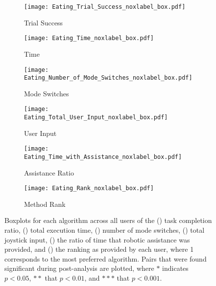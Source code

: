 \begin{figure}[t]
\centering
{}
\begin{subfigure}{0.238\textwidth}
  \texttt{[image: Eating\_Trial\_Success\_noxlabel\_box.pdf]}
  \caption{Trial Success}
  \label{subfig:trial_success}
\end{subfigure}
\hfill
\begin{subfigure}{0.242\textwidth}
  \texttt{[image: Eating\_Time\_noxlabel\_box.pdf]}
  \caption{Time}
  \label{subfig:time}
\end{subfigure}

\begin{subfigure}{0.238\textwidth}
  \texttt{[image: Eating\_Number\_of\_Mode\_Switches\_noxlabel\_box.pdf]}
  \caption{Mode Switches}
  \label{subfig:num_mode_switches}
\end{subfigure}
\hfill
\begin{subfigure}{0.242\textwidth}
  \texttt{[image: Eating\_Total\_User\_Input\_noxlabel\_box.pdf]}
  \caption{User Input}
  \label{subfig:user_input}
\end{subfigure}

\begin{subfigure}{0.238\textwidth}
  \texttt{[image: Eating\_Time\_with\_Assistance\_noxlabel\_box.pdf]}
  \caption{Assistance Ratio}
  \label{subfig:assist_ratio}
\end{subfigure}
\hfill
\begin{subfigure}{0.242\textwidth}
  \texttt{[image: Eating\_Rank\_noxlabel\_box.pdf]}
  \caption{Method Rank}
  \label{subfig:rank}
\end{subfigure}
\caption{Boxplots for each algorithm across all users of the () task completion ratio, () total execution time, () number of mode switches, () total joystick input, () the ratio of time that robotic assistance was provided, and () the ranking as provided by each user, where 1 corresponds to the most preferred algorithm. Pairs that were found significant during post-analysis are plotted, where ${*}$ indicates $p<0.05$, ${*}{*}$ that $p<0.01$, and ${*}{*}{*}$ that $p<0.001$.}
 \label{fig:box_results}
\end{figure}





